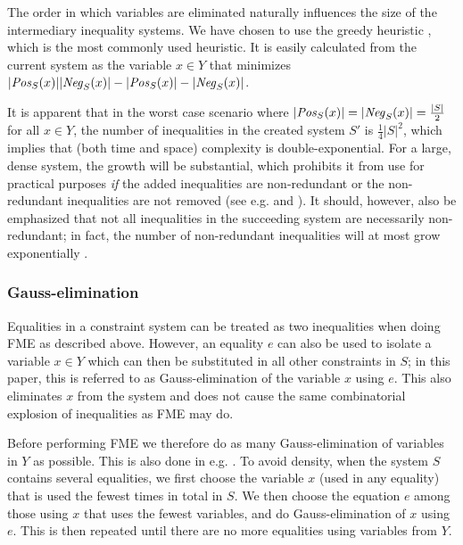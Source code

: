 The order in which variables are eliminated naturally influences the size of the intermediary inequality systems. We have chosen to use the greedy heuristic , which is the most commonly used heuristic. It is easily calculated from the current system as the variable $x\in Y$ that minimizes $|\mathit{Pos}_S(x)||\mathit{Neg}_S(x)| - |\mathit{Pos}_S(x)|-|\mathit{Neg}_S(x)|$. 


It is apparent that in the worst case scenario where $|\mathit{Pos}_S(x)| = |\mathit{Neg}_S(x)| = \frac{|S|}{2}$ for all $x\in Y$, the number of inequalities in the created system $S'$ is $\frac{1}{4}|S|^2$, which implies that (both time and space) complexity is double-exponential. For a large, dense system, the growth will be substantial, which prohibits it from use for practical purposes \emph{if} the added inequalities are non-redundant or the non-redundant inequalities are not removed ({see e.g. \cite{lassez93} and \cite{lukatskii08}}). It should, however, also be emphasized that not all inequalities in the succeeding system are necessarily non-redundant; in fact, the number of non-redundant inequalities will at most grow exponentially \cite{monniaux10}.

\subsubsection{Gauss-elimination}
Equalities in a constraint system can be treated as two inequalities when doing FME as described above. However, an equality $e$ can also be used to isolate a variable $x\in Y$ which can then be substituted in all other constraints in $S$; in this paper, this is referred to as Gauss-elimination of the variable $x$ using $e$. This also eliminates $x$ from the system and does not cause the same combinatorial explosion of inequalities as FME may do. 

Before performing FME we therefore do as many Gauss-elimination of variables in $Y$ as possible. This is also done in e.g. \cite{simon05}.
%
To avoid density, when the system $S$ contains several equalities, we first choose the variable $x$ (used in any equality) that is used the fewest times in total in $S$. We then choose the equation $e$ among those using $x$ that uses the fewest variables, and do Gauss-elimination of $x$ using $e$. 
This is then repeated until there are no more equalities using variables from $Y$.
 
